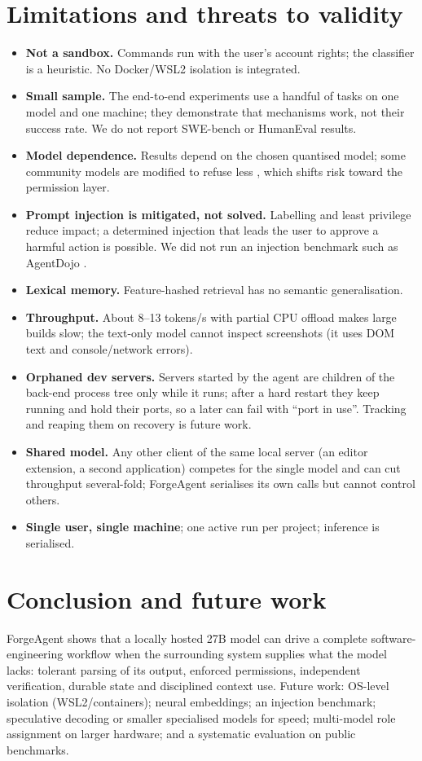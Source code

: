 \documentclass[11pt,a4paper]{article}
\newcommand{\code}[1]{\texttt{\detokenize{#1}}}
\begin{document}
\section{Limitations and threats to validity}\label{sec:limits}
\begin{itemize}
  \item \textbf{Not a sandbox.} Commands run with the user's account rights; the classifier is a heuristic. No Docker/WSL2 isolation is integrated.
  \item \textbf{Small sample.} The end-to-end experiments use a handful of tasks on one model and one machine; they demonstrate that mechanisms work, not their success rate. We do not report SWE-bench or HumanEval \citep{chen2021codex} results.
  \item \textbf{Model dependence.} Results depend on the chosen quantised model; some community models are modified to refuse less \citep{arditi2024refusal}, which shifts risk toward the permission layer.
  \item \textbf{Prompt injection is mitigated, not solved.} Labelling and least privilege reduce impact; a determined injection that leads the user to approve a harmful action is possible. We did not run an injection benchmark such as AgentDojo \citep{debenedetti2024agentdojo}.
  \item \textbf{Lexical memory.} Feature-hashed retrieval has no semantic generalisation.
  \item \textbf{Throughput.} About 8--13 tokens/s with partial CPU offload makes large builds slow; the text-only model cannot inspect screenshots (it uses DOM text and console/network errors).
  \item \textbf{Orphaned dev servers.} Servers started by the agent are children of the back-end process tree only while it runs; after a hard restart they keep running and hold their ports, so a later \code{start_dev_server} can fail with ``port in use''. Tracking and reaping them on recovery is future work.
  \item \textbf{Shared model.} Any other client of the same local server (an editor extension, a second application) competes for the single model and can cut throughput several-fold; ForgeAgent serialises its own calls but cannot control others.
  \item \textbf{Single user, single machine}; one active run per project; inference is serialised.
\end{itemize}

\section{Conclusion and future work}
ForgeAgent shows that a locally hosted 27B model can drive a complete software-engineering workflow when the surrounding system supplies what the model lacks: tolerant parsing of its output, enforced permissions, independent verification, durable state and disciplined context use.
Future work: OS-level isolation (WSL2/containers); neural embeddings; an injection benchmark; speculative decoding or smaller specialised models for speed; multi-model role assignment on larger hardware; and a systematic evaluation on public benchmarks.
\end{document}
